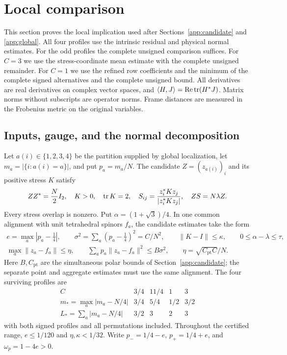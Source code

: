 \section{Local comparison}
\label{app:local}

This section proves the local implication used after
Sections~\ref{app:candidate} and \ref{app:global}.
All four profiles use the intrinsic residual and physical normal estimates.
For the odd profiles the complete unsigned comparison suffices.
For $C=3$ we use the stress-coordinate mean estimate with the complete
unsigned remainder. For $C=1$ we use the refined row coefficients and
the minimum of the complete signed alternatives and the complete unsigned
bound.
All derivatives are real derivatives on complex vector spaces, and
$\langle H,J\rangle=\operatorname{Re}\operatorname{tr}(H^*J)$. Matrix norms without subscripts are
operator norms. Frame distances are measured in the Frobenius metric on
the original variables.

\subsection{Inputs, gauge, and the normal decomposition}
\label{app:local:inputs}

Let $a(i)\in\{1,2,3,4\}$ be the partition supplied by global localization,
let $m_a=|\{i:a(i)=a\}|$, and put $p_a=m_a/N$.
The candidate $Z=(z_{a(i)})_i$ and its positive stress $K$ satisfy
\begin{equation}\label{app:local:stationary-data}
 ZZ^*=\frac N2 I_2,\quad K>0,\quad\operatorname{tr} K=2,\quad
 S_{ij}=\frac{z_i^*Kz_j}{|z_i^*Kz_j|},\quad ZS=N\lambda Z.
\end{equation}
Every stress overlap is nonzero. Put $\alpha=(1+\sqrt3)/4$.
In one common alignment with unit tetrahedral spinors $f_a$, the candidate
estimates take the form
\begin{gather}
 e=\max_a|p_a-\tfrac14|,\qquad
 \sigma^2=\sum_a(p_a-\tfrac14)^2=C/N^2,\qquad
 \|K-I\|\le\kappa,\qquad 0\le\alpha-\lambda\le\tau,
 \label{app:local:errors}\\
 \max_a\|z_a-f_a\|\le\eta,\qquad
 \sum_a p_a\|z_a-f_a\|^2\le B\sigma^2,\qquad
 \eta=\sqrt{C_{\mathrm{pt}}C}/N.                                  \label{app:local:polar-input}
\end{gather}
Here $B,C_{\mathrm{pt}}$ are the simultaneous polar bounds of
Section~\ref{app:candidate}; the separate point and aggregate estimates
must use the same alignment. The four surviving profiles are
\[
\begin{array}{c|cccc}
 C&3/4&11/4&1&3\\ \hline
 m_*=\max_a|m_a-N/4|&3/4&5/4&1/2&3/2\\
 L_*=\sum_a|m_a-N/4|&3/2&3&2&3
\end{array}
\]
with both signed profiles and all permutations included.
Throughout the certified range, $e\le1/120$ and $\eta,\kappa<1/32$.
Write $p_-=1/4-e$, $p_+=1/4+e$, and $\omega_p=1-4e>0$.

